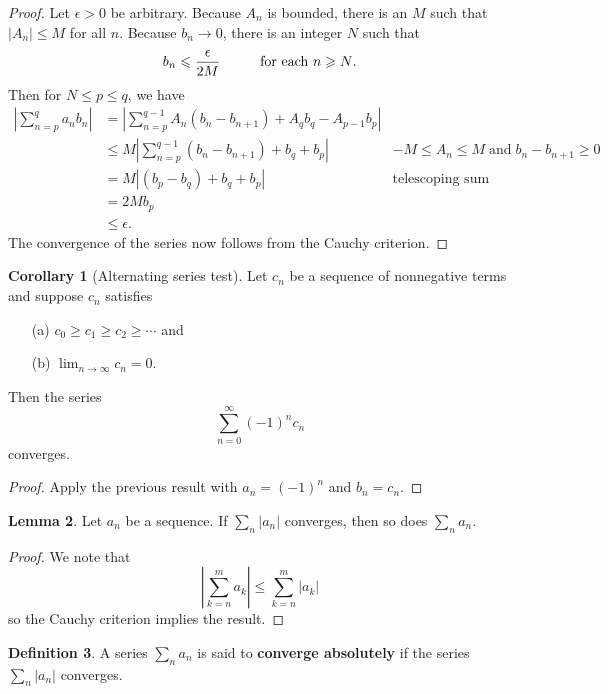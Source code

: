 \documentclass[12pt]{article}
\theoremstyle{definition}
\newtheorem{definition}{Definition}
\theoremstyle{theorem}
\newtheorem{corollary}[definition]{Corollary}
\newtheorem{lemma}[definition]{Lemma}
\begin{document}
\begin{proof}
 Let $\epsilon > 0$ be arbitrary.  Because $A_n$ is bounded, there is an $M$ such that $|A_n| \leqslant M$ for all $n$. Because $b_n \to 0$, there is an integer $N$ such that 
\[
b_n \leqslant \frac{\epsilon}{2M} \hspace{10mm} \text{for each $n \geqslant N$}. 
\]
Then for $N \leqslant p \leqslant q$, we have 
\begin{align*}
\left|\sum_{n=p}^q a_nb_n\right| &= \left|\sum_{n=p}^{q-1} A_n(b_n - b_{n+1}) + A_qb_q - A_{p-1}b_p\right| \\
&\leqslant M \left|\sum_{n=p}^{q-1}(b_n - b_{n+1}) + b_q + b_p\right| &-M \leqslant A_n \leqslant M \; \text{and} \; b_n - b_{n+1} \geqslant 0 \\
&= M \left|(b_p - b_q) + b_q + b_p\right| &\text{telescoping sum} \\
&= 2M b_p \\
&\leqslant \epsilon.
\end{align*}
The convergence of the series now follows from the Cauchy criterion. 
\end{proof}

\begin{corollary}[Alternating series test]
Let $c_n$ be a sequence of nonnegative terms and suppose $c_n$ satisfies 
\begin{enumerate}
\item[(a)] $c_0 \geqslant c_1 \geqslant c_2 \geqslant \cdots$ and 
\item[(b)] $\lim_{n \to \infty} c_n = 0$.
\end{enumerate}
Then the series 
\[
\sum_{n=0}^\infty (-1)^n c_n
\]
converges. 
\end{corollary}

\begin{proof}
Apply the previous result with $a_n = (-1)^n$ and $b_n = c_n$. 
\end{proof}

\begin{lemma}
Let $a_n$ be a sequence. If $\sum_n |a_n|$ converges, then so does $\sum_n a_n$. 
\end{lemma}

\begin{proof}
We note that 
\[
\left|\sum_{k=n}^m a_k\right| \leqslant \sum_{k=n}^m |a_k|
\]
so the Cauchy criterion implies the result. 
\end{proof}

\begin{definition}
A series $\sum_n a_n$ is said to \textbf{converge absolutely} if the series $\sum_n |a_n|$ converges. 
\end{definition}
\end{document}
